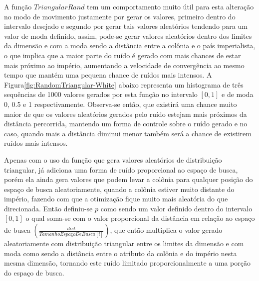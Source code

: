 	A função \(TriangularRand\) tem um comportamento muito útil para esta alteração no modo de movimento justamente por gerar os valores, primeiro dentro do intervalo desejado e segundo por gerar tais valores aleatórios tendendo para um valor de moda definido, assim, pode-se gerar valores aleatórios dentro dos limites da dimensão e com a moda sendo a distância entre a colônia e o país imperialista, o que implica que a maior parte do ruído é gerado com mais chances de estar mais próximo ao império, aumentando a velocidade de convergência ao mesmo tempo que mantém uma pequena chance de ruídos mais intensos. A Figura\ref{fig:RandomTriangular-White} abaixo representa um histograma de três sequências de 1000 valores gerados por esta função no intervalo \(\left[0,1\right]\) e de moda 0, 0.5 e 1 respectivamente. Observa-se então, que existirá uma chance muito maior de que os valores aleatórios gerados pelo ruído estejam mais próximos da distância percorrida, mantendo um forma de controle sobre o ruído gerado e no caso, quando mais a distância diminui menor também será a chance de existirem ruídos mais intensos. 
	
	Apenas com o uso da função que gera valores aleatórios de distribuição triangular, já adiciona uma forma de ruído proporcional ao espaço de busca, porém ela ainda gera valores que podem levar a colônia para qualquer posição do espaço de busca aleatoriamente, quando a colônia estiver muito distante do império, fazendo com que a otimização fique muito mais aleatória do que direcionada. Então definiu-se \(p\) como sendo um valor definido dentro do intervalo \(\left[0,1\right]\) o qual soma-se com o valor proporcional da distância em relação ao espaço de busca \(\left(\frac{dist}{TamanhoEspaçoDeBusca[i]}\right)\), que então multiplica o valor gerado aleatoriamente com distribuição triangular entre os limites da dimensão e com moda como sendo a distância entre o atributo da colônia e do império nesta mesma dimensão, tornando este ruído limitado proporcionalmente a uma porção do espaço de busca. 
    
